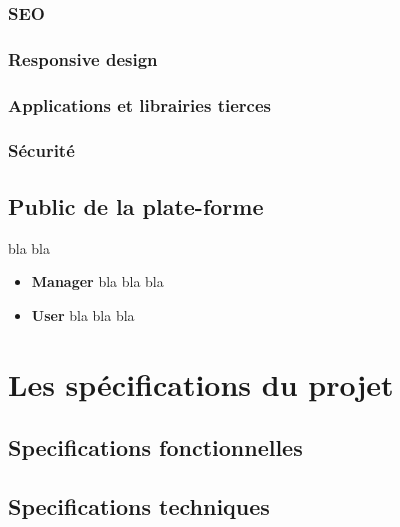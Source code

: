 \documentclass[french]{book}
\begin{document}
\subsection{SEO}
\subsection{Responsive design}
\subsection{Applications et librairies tierces}
\subsection{Sécurité}




\section{Public de la plate-forme}
bla bla
    \begin{itemize}
        \item \textbf{Manager} bla bla bla
        \item \textbf{User} bla bla bla
    \end{itemize}
    
\chapter{Les spécifications du projet}

\section{Specifications fonctionnelles} 

\section{Specifications techniques} 
\end{document}
